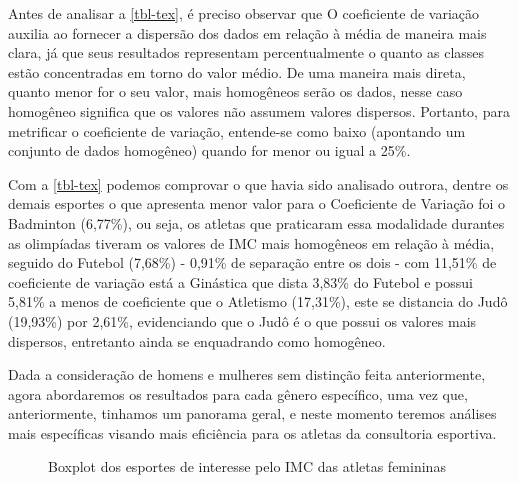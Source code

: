 \documentclass[
]{estat/estat}
\begin{document}
Antes de analisar a \ref{tbl-tex}, é preciso observar que O coeficiente
de variação auxilia ao fornecer a dispersão dos dados em relação à média
de maneira mais clara, já que seus resultados representam
percentualmente o quanto as classes estão concentradas em torno do valor
médio. De uma maneira mais direta, quanto menor for o seu valor, mais
homogêneos serão os dados, nesse caso homogêneo significa que os valores
não assumem valores dispersos. Portanto, para metrificar o coeficiente
de variação, entende-se como baixo (apontando um conjunto de dados
homogêneo) quando for menor ou igual a 25\%.

Com a \ref{tbl-tex} podemos comprovar o que havia sido analisado
outrora, dentre os demais esportes o que apresenta menor valor para o
Coeficiente de Variação foi o Badminton (6,77\%), ou seja, os atletas
que praticaram essa modalidade durantes as olimpíadas tiveram os valores
de IMC mais homogêneos em relação à média, seguido do Futebol (7,68\%) -
0,91\% de separação entre os dois - com 11,51\% de coeficiente de
variação está a Ginástica que dista 3,83\% do Futebol e possui 5,81\% a
menos de coeficiente que o Atletismo (17,31\%), este se distancia do
Judô (19,93\%) por 2,61\%, evidenciando que o Judô é o que possui os
valores mais dispersos, entretanto ainda se enquadrando como homogêneo.

Dada a consideração de homens e mulheres sem distinção feita
anteriormente, agora abordaremos os resultados para cada gênero
específico, uma vez que, anteriormente, tinhamos um panorama geral, e
neste momento teremos análises mais específicas visando mais eficiência
para os atletas da consultoria esportiva.

\begin{figure}

\caption{\label{fig-box-fem}Boxplot dos esportes de interesse pelo IMC
das atletas femininas}


\end{figure}%
\end{document}
